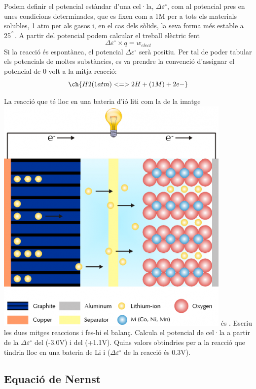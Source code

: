 Podem definir el potencial estàndar d'una cel·la, $\Delta \varepsilon^{\circ}$, com al potencial pres en unes condicions determinades, que es fixen com a 1M per a tots els materials solubles, 1 atm per als gasos i, en el cas dels sòlids, la seva forma més estable a 25$^{\degree}$.
A partir del potencial podem calcular el treball elèctric fent
\[\Delta \varepsilon^{\circ} \times q = w_{elect}\]
Si la reacció és espontànea, el potencial $\Delta \varepsilon^{\circ}$ serà positiu.
Per tal de poder tabular els potencials de moltes substàncies, es va prendre la convenció d'assignar el potencial de 0 volt a la mitja reacció:
\[\ch{H2 (1 atm) <=> 2 H+ (1 M) + 2 e-}\]

\begin{exr}
La reacció que té lloc en una bateria d'ió liti com la de la imatge
\includegraphics[scale=0.5]{figures/LiIon.png}
és . Escriu les dues mitges reaccions i fes-hi el balanç. Calcula el potencial de cel·la a partir de la $\Delta \varepsilon^{\circ}$ del  (-3.0V) i del  (+1.1V).
Quins valors obtindries per a la reacció que tindria lloc en una bateria de Li i  ($\Delta \varepsilon^{\circ}$ de la reacció  és 0.3V).
\end{exr}

\subsection{Equació de Nernst}

